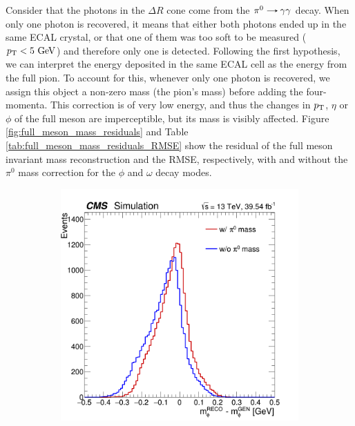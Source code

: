 \begin{myitemlist}
    Consider that the photons in the $\Delta R$ cone come from the $\pi^{0}\decaysto\gamma\gamma$ decay. When only one photon is recovered, it means that either both photons ended up in the same ECAL crystal, or that one of them was too soft to be measured ($p_\text{T} < 5\ \text{GeV}$) and therefore only one is detected. Following the first hypothesis, we can interpret the energy deposited in the same ECAL cell as the energy from the full pion. To account for this, whenever only one photon is recovered, we assign this object a non-zero mass (the pion's mass) before adding the four-momenta. This correction is of very low energy, and thus the changes in $p_\text{T}$, $\eta$ or $\phi$ of the full meson are imperceptible, but its mass is visibly affected. Figure \ref{fig:full_meson_mass_residuals} and Table \ref{tab:full_meson_mass_residuals_RMSE} show the residual of the full meson invariant mass reconstruction and the RMSE, respectively, with and without the $\pi^0$ mass correction for the $\phi$ and $\omega$ decay modes.
    \begin{figure}[!ht]
        \captionsetup[subfigure]{labelformat=empty}
        \vspace*{-0.2cm}
        \centering
        \setlength{\mylength}{\textwidth}
        \begin{subfigure}[t]{0.50\mylength}
                \centering
                \includegraphics[width=0.45\mylength]{resources/plots/Phi3_fullmeson_mass_residual.png}

\end{subfigure}
\end{figure}
\end{myitemlist}

